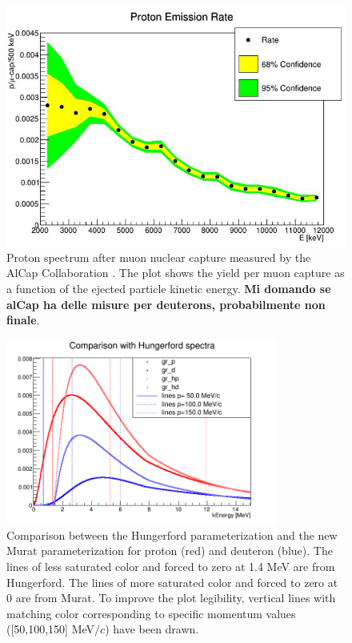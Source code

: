 \documentclass[12pt,a4paper,openright, oneside, titlepage]{book} %
\begin{document}
\begin{figure}[h!]
\centering
\includegraphics[scale=0.6]{new_spectra_2/Quirk_protons}
\caption[AlCap measured spectra]{Proton spectrum after muon nuclear capture measured by the AlCap Collaboration \cite{AlCap:2020}. 
The plot shows
the yield per muon capture as a function of the ejected particle kinetic energy.
{\bf{Mi domando se alCap ha delle misure per deuterons, probabilmente non finale}}.}
\label{_AlCap}
\end{figure}

\begin{figure}[h!]
\centering
\includegraphics[width =0.8\textwidth, keepaspectratio]{new_spectra_2/comparison2}
\caption[Comparison of spectrum parameteerizations]{Comparison \cite{io:comparison} between the Hungerford parameterization \cite{Hungerford} 
and the new Murat parameterization \cite{Pasha:spectra} for proton (red) and deuteron (blue). 
The lines of less saturated color and forced to zero at 1.4 MeV are from Hungerford.
 The lines of more saturated color and forced to zero at 0 are from Murat.
To improve the plot legibility, 
vertical lines with matching color corresponding to specific momentum values ([50,100,150] MeV$/c$) have been drawn.}
\label{_comparison2}
\end{figure}
\end{document}
